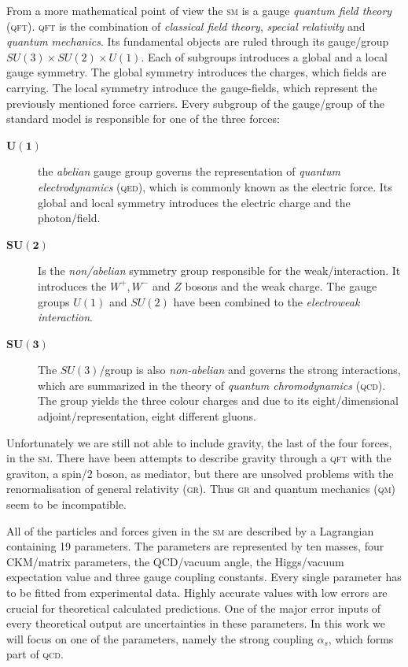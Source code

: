 \documentclass[../../index.tex]{subfiles}
\begin{document}
From a more mathematical point of view the \textsc{sm} is a gauge \textit{
  quantum field theory} (\textsc{qft}). \textsc{qft} is the
combination of \textit{classical field theory}, \textit{special relativity} and
\textit{quantum mechanics}. Its fundamental objects are ruled through its
gauge\-/group $SU(3)\times SU(2)\times U(1)$. Each of subgroups introduces a
global and a local gauge symmetry. The global symmetry introduces the charges,
which fields are carrying. The local symmetry introduce the gauge-fields, which
represent the previously mentioned force carriers. Every subgroup of the
gauge\-/group of the standard model is responsible for one of the three forces:
\begin{description}
  \item[$\bm{U(1)}$] the \textit{abelian} gauge group governs the representation of \textit{quantum
      electrodynamics} (\textsc{qed}), which is commonly known as the electric
    force. Its global and local symmetry introduces the electric charge and the
    photon\-/field.
  \item[$\bm{SU(2)}$] Is the \textit{non\-/abelian} symmetry group responsible
    for the weak\-/interaction. It introduces the $W^+,W^-$ and $Z$ bosons and
    the weak charge. The gauge groups $U(1)$ and $SU(2)$ have been combined to the \textit{electroweak interaction}.
  \item[$\bm{SU(3)}$] The $SU(3)$\-/group is also \textit{non-abelian} and
    governs the strong interactions, which are summarized in the theory of
    \textit{quantum chromodynamics} (\textsc{qcd}). The group yields the three
    colour charges and due to its eight\-/dimensional adjoint\-/representation,
    eight different gluons.
\end{description}
Unfortunately we are still not able to include gravity, the last of the four
forces, in the \textsc{sm}. There have been attempts to describe gravity through
a \textsc{qft} with the graviton, a spin\-/2 boson, as mediator, but there are
unsolved problems with the renormalisation of general relativity (\textsc{gr}).
Thus \textsc{gr} and quantum mechanics (\textsc{qm}) seem to be incompatible.

All of the particles and forces given in the \textsc{sm} are described by a Lagrangian
containing 19 parameters. The parameters are represented by ten masses, four CKM\-/matrix parameters, the QCD\-/vacuum
angle, the Higgs\-/vacuum expectation value and three gauge coupling constants.
Every single parameter has to be fitted from experimental data. Highly accurate
values with low errors are crucial for theoretical calculated predictions. One
of the major error inputs of every theoretical output are uncertainties in these
parameters. In this work we will focus on one of the parameters, namely the
strong coupling $\alpha_s$, which forms part of \textsc{qcd}.
\end{document}
